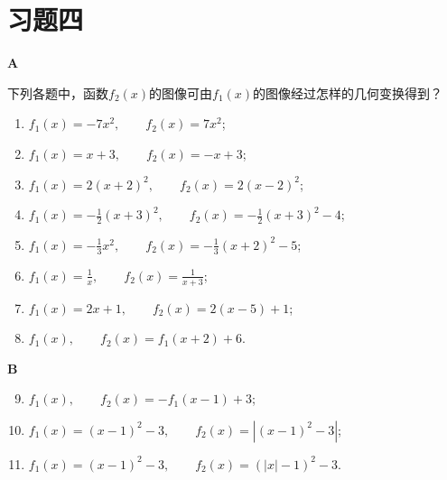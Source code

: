 \begin{analyze}
\begin{enumerate}[(1)]
\begin{figure}[htp]
    \caption{}
\end{figure}    
\end{enumerate}
\end{analyze}

\section*{习题四}
\begin{center}
    \bfseries A
\end{center}

下列各题中，函数$f_2(x)$的图像可由$f_1(x)$的图像经过怎样的几何变换得到？
\begin{enumerate}[(1)]
    \item $f_1(x)=-7x^2,\qquad f_2(x)=7x^2$;
    \item $f_{1}(x)=x+3,\qquad f_{2}(x)=-x+3$;
    \item $f_{1}(x)=2(x+2)^{2},\qquad f_{2}(x)=2(x-2)^{2}$;
    \item $f_{1}(x)=-\frac{1}{2}(x+3)^{2},\qquad f_{2}(x)=-\frac{1}{2}(x+3)^{2}-4$;
    \item $f_{1}(x)=-\frac{1}{3}x^{2},\qquad f_{2}(x)=-\frac{1}{3}(x+2)^{2}-5$;
    \item $f_{1}(x)=\frac{1}{x},\qquad f_{2}(x)=\frac{1}{x+3}$;
    \item $f_{1}(x)=2x+1,\qquad f_{2}(x)=2(x-5)+1$;
    \item $ f_{1}(x),\qquad f_{2}(x)=f_{1}(x+2)+6$.
\end{enumerate}

\begin{center}
    \bfseries B
\end{center}
\begin{enumerate}[(1)]\setcounter{enumi}{8}
    \item $f_{1}(x),\qquad f_{2}(x)=-f_{1}(x-1)+3$;
    \item $f_{1}(x)=(x-1)^{2}-3,\qquad f_{2}(x)=|(x-1)^{2}-3|$;
    \item $f_{1}(x)=(x-1)^{2}-3,\qquad f_{2}(x)=(| x|-1)^{2}-3$.
\end{enumerate}

